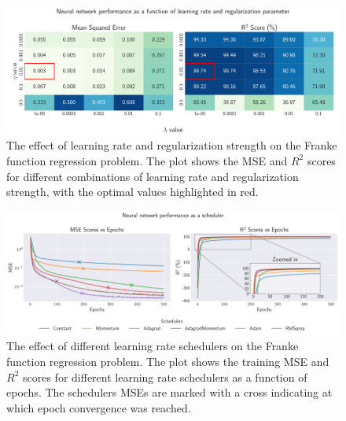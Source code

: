 \documentclass[aps,pra,english,notitlepage,reprint,nofootinbib]{revtex4-1}  %
\begin{document}
\begin{onecolumngrid}
    \begin{center}
        \begin{figure}[h!]
            \includegraphics[width = .75\textwidth]{../figs/c_eta_lambda.pdf}
            \caption{The effect of learning rate and regularization strength on the Franke function regression problem. The plot shows the MSE and \( R^2 \) scores for different combinations of learning rate and regularization strength, with the optimal values highlighted in red.}
            \label{fig:NN_Franke_eta_lambda}
        \end{figure}
    \end{center}
\end{onecolumngrid}

\begin{onecolumngrid}
    \begin{figure}[h!]
        \centering
        \includegraphics[width = .9\textwidth]{../figs/b_schedulers.pdf}
        \caption{The effect of different learning rate schedulers on the Franke function regression problem. The plot shows the training MSE and \( R^2 \) scores for different learning rate schedulers as a function of epochs. The schedulers MSEs are marked with a cross indicating at which epoch convergence was reached.}
        \label{fig:NN_Franke_schedulers}
    \end{figure}
\end{onecolumngrid}
\end{document}
